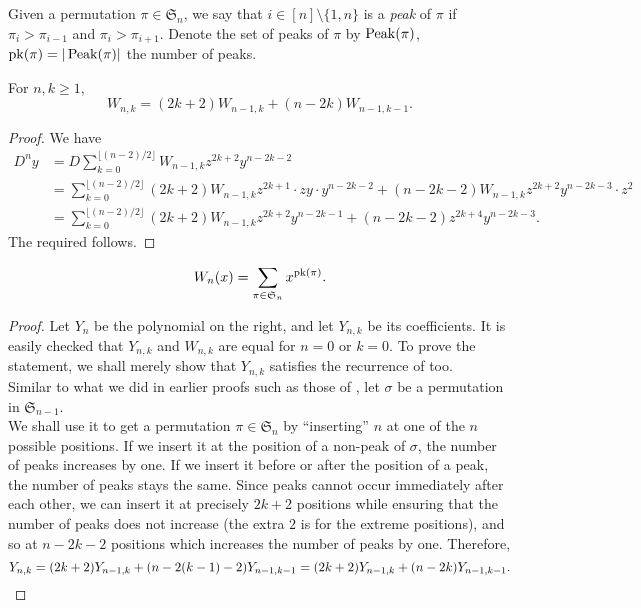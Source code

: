 	\begin{fdef}[Peak]
		Given a permutation $\pi \in \mathfrak{S}_n$, we say that $i \in [n] \setminus \{1,n\}$ is a \emph{peak} of $\pi$ if $\pi_i > \pi_{i-1}$ and $\pi_i > \pi_{i+1}$. Denote the set of peaks of $\pi$ by $\operatorname{Peak}(\pi)$, $\operatorname{pk}(\pi) = |\operatorname{Peak}(\pi)|$ the number of peaks.
	\end{fdef}

	\begin{lemma}
		\label{lem: Wnk recurrence}
		For $n,k \ge 1$,
		\[ W_{n,k} = (2k+2) W_{n-1,k} + (n-2k) W_{n-1,k-1}. \]
	\end{lemma}
	\begin{proof}
		We have
		\begin{align*}
			D^{n}y &= D \sum_{k=0}^{\lfloor (n-2)/2 \rfloor} W_{n-1,k} z^{2k+2} y^{n-2k-2} \\
				&= \sum_{k=0}^{\lfloor (n-2)/2 \rfloor} (2k+2) W_{n-1,k} z^{2k+1} \cdot zy \cdot y^{n-2k-2} + (n-2k-2) W_{n-1,k} z^{2k+2} y^{n-2k-3} \cdot z^2 \\
				&= \sum_{k=0}^{\lfloor (n-2)/2 \rfloor} (2k+2) W_{n-1,k} z^{2k+2} y^{n-2k-1} + (n-2k-2) z^{2k+4} y^{n-2k-3}.
		\end{align*}
		The required follows.
	\end{proof}

	\begin{ftheo}
		\[ W_n(x) = \sum_{\pi \in \mathfrak{S}_n} x^{\operatorname{pk}(\pi)}. \]
	\end{ftheo}
	\begin{proof}
		Let $Y_n$ be the polynomial on the right, and let $Y_{n,k}$ be its coefficients. It is easily checked that $Y_{n,k}$ and $W_{n,k}$ are equal for $n=0$ or $k=0$. To prove the statement, we shall merely show that $Y_{n,k}$ satisfies the recurrence of  too.\\
		Similar to what we did in earlier proofs such as those of , let $\sigma$ be a permutation in $\mathfrak{S}_{n-1}$.\\ We shall use it to get a permutation $\pi \in \mathfrak{S}_n$ by ``inserting'' $n$ at one of the $n$ possible positions. If we insert it at the position of a non-peak of $\sigma$, the number of peaks increases by one. If we insert it before or after the position of a peak, the number of peaks stays the same. Since peaks cannot occur immediately after each other, we can insert it at precisely $2k+2$ positions while ensuring that the number of peaks does not increase (the extra $2$ is for the extreme positions), and so at $n-2k-2$ positions which increases the number of peaks by one. Therefore,
		\[ Y_{n,k} = (2k+2)Y_{n-1,k} + (n-2(k-1)-2)Y_{n-1,k-1} = (2k+2) Y_{n-1,k} + (n-2k)Y_{n-1,k-1}. \qedhere \]
	\end{proof}

